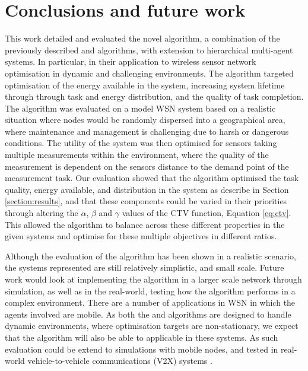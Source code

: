 \section{Conclusions and future work}
\label{section:conclusions}

This work detailed and evaluated the novel \acronymWSNOptimisation{}{} algorithm, a combination of the previously described \acronymATARIA{}{} and \acronymMGRAO{}{} algorithms, with extension to hierarchical multi-agent systems. In particular, in their application to wireless sensor network optimisation in dynamic and challenging environments. The algorithm targeted optimisation of the energy available in the system, increasing system lifetime through through task and energy distribution, and the quality of task completion. The algorithm was evaluated on a model WSN system based on a realistic situation where nodes would be randomly dispersed into a geographical area, where maintenance and management is challenging due to harsh or dangerous conditions. The utility of the system was then optimised for sensors taking multiple measurements within the environment, where the quality of the measurement is dependent on the sensors distance to the demand point of the measurement task. Our evaluation showed that the \acronymWSNOptimisation{}{} algorithm optimised the task quality, energy available, and distribution in the system as describe in Section \ref{section:results}, and that these components could be varied in their priorities through altering the $\alpha$, $\beta$ and $\gamma$ values of the CTV function, Equation \ref{eq:ctv}. This allowed the algorithm to balance across these different properties in the given systems and optimise for these multiple objectives in different ratios. 

Although the evaluation of the algorithm has been shown in a realistic scenario, the systems represented are still relatively simplistic, and small scale. Future work would look at implementing the algorithm in a larger scale network through simulation, as well as in the real-world, testing how the algorithm performs in a complex environment. There are a number of applications in WSN in which the agents involved are mobile. As both the \acronymATARIA{}{} and \acronymMGRAO{}{} algorithms are designed to handle dynamic environments, where optimisation targets are non-stationary, we expect that the \acronymWSNOptimisation{}{} algorithm will also be able to applicable in these systems. As such evaluation could be extend to simulations with mobile nodes, and tested in real-world vehicle-to-vehicle communications (V2X) systems \citep{Gupta2017, Tong2019}.


  